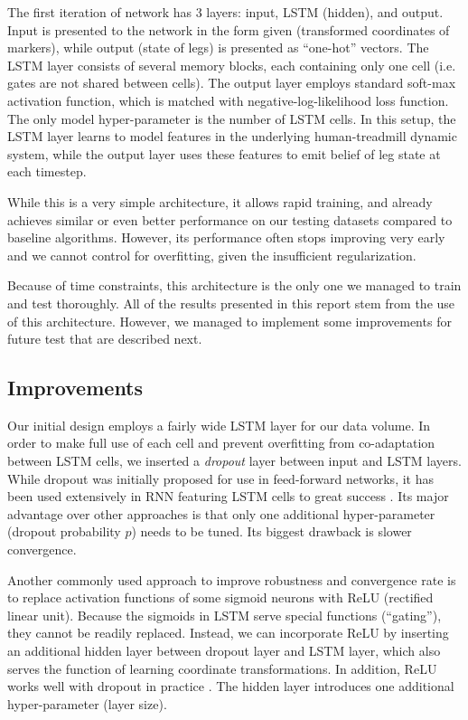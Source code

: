 \documentclass{acm_proc_article-sp}
\begin{document}
The first iteration of network has 3 layers: input, LSTM (hidden), and output. Input is presented to the network in the form given (transformed coordinates of markers), while output (state of legs) is presented as ``one-hot'' vectors. The LSTM layer consists of several memory blocks, each containing only one cell (i.e. gates are not shared between cells). The output layer employs standard soft-max activation function, which is matched with negative-log-likelihood loss function. The only model hyper-parameter is the number of LSTM cells. In this setup, the LSTM layer learns to model features in the underlying human-treadmill dynamic system, while the output layer uses these features to emit belief of leg state at each timestep.

While this is a very simple architecture, it allows rapid training, and already achieves similar or even better performance on our testing datasets compared to baseline algorithms. However, its performance often stops improving very early and we cannot control for overfitting, given the insufficient regularization.

Because of time constraints, this architecture is the only one we managed to train and test thoroughly. All of the results presented in this report stem from the use of this architecture. However, we managed to implement some improvements for future test that are described next.

\subsection{Improvements}

Our initial design employs a fairly wide LSTM layer for our data volume. In order to make full use of each cell and prevent overfitting from co-adaptation between LSTM cells, we inserted a \emph{dropout} \cite{Hinton2012} layer between input and LSTM layers. While dropout was initially proposed for use in feed-forward networks, it has been used extensively in RNN featuring LSTM cells to great success \cite{Pham2013}. Its major advantage over other approaches is that only one additional hyper-parameter (dropout probability $p$) needs to be tuned. Its biggest drawback is slower convergence.

Another commonly used approach to improve robustness and convergence rate is to replace activation functions of some sigmoid neurons with ReLU (rectified linear unit). Because the sigmoids in LSTM serve special functions (``gating''), they cannot be readily replaced. Instead, we can incorporate ReLU by inserting an additional hidden layer between dropout layer and LSTM layer, which also serves the function of learning coordinate transformations. In addition, ReLU works well with dropout in practice \cite{Pham2013,Dahl2013}. The hidden layer introduces one additional hyper-parameter (layer size).
\end{document}
